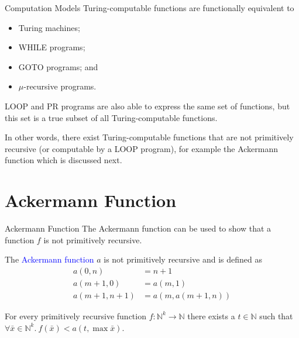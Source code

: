 \documentclass{beamer}
\theoremstyle{definition}
\def\spadding{\vspace{0.25cm}}
\def\b{\textcolor{blue}}
\begin{document}
\begin{frame}{Computation Models}
    Turing-computable functions are functionally equivalent to \begin{itemize}
        \item Turing machines;
        \item WHILE programs;
        \item GOTO programs; and
        \item $\mu$-recursive programs.
    \end{itemize}\pause\spadding

    LOOP and PR programs are also able to express the same set of functions, but this set is a true subset of all Turing-computable functions.\pause\par
    In other words, there exist Turing-computable functions that are not primitively recursive (or computable by a LOOP program), for example the Ackermann function which is discussed next.
\end{frame}

\section{Ackermann Function}

\begin{frame}{Ackermann Function}
    The Ackermann function can be used to show that a function $f$ is not primitively recursive.\pause
    \begin{definition}
        The \b{Ackermann function} $a$ is not primitively recursive and is defined as \begin{align*}
            a(0,n) &= n+1 \\
            a(m+1,0) &= a(m,1) \\
            a(m+1,n+1) &= a(m,a(m+1,n))
        \end{align*}
    \end{definition}\pause
    \begin{theorem}
        For every primitively recursive function $f : \mathbb{N}^k \to \mathbb{N}$ there exists a $t \in \mathbb{N}$ such that $\forall \bar{x} \in \mathbb{N}^k.\ f(\bar{x}) < a(t, \max \bar{x})$.
    \end{theorem}
\end{frame}



\end{document}
